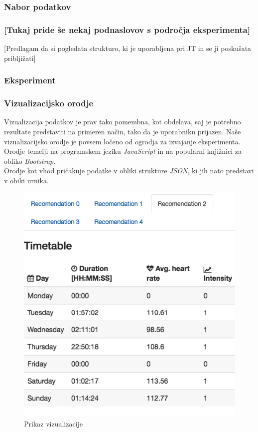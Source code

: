 \documentclass{acm_proc_article-sp}
\begin{document}
\subsubsection{Nabor podatkov}

\subsubsection{[Tukaj pride še nekaj podnaslovov s področja eksperimenta]}
[Predlagam da si pogledata strukturo, ki je uporabljena pri JT in se ji poskušata pribljižati]

\subsubsection{Eksperiment}

\subsubsection{Vizualizacijsko orodje}
Vizualizacija podatkov je prav tako pomembna, kot obdelava, saj je potrebno rezultate predstaviti na primeren način, tako da je uporabniku prijazen. Naše vizualizacijsko orodje je povsem ločeno od ogrodja za izvajanje eksperimenta. Orodje temelji na programskem jeziku \textit{JavaScript} in na popularni knjižnici za obliko \textit{Bootstrap}.\\
Orodje kot vhod pričakuje podatke v obliki strukture \textit{JSON}, ki jih nato predstavi v obiki urnika.\\ 


\begin{figure}
 \centering
 \includegraphics[width=\linewidth]{vizualization}
 \caption{Prikaz vizualizacije}
\end{figure}
\end{document}
